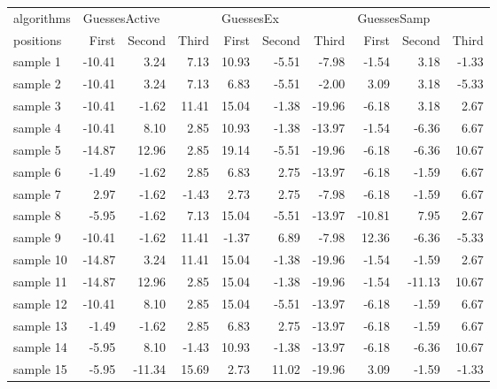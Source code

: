 \begin{table}
\begin{tabular}{lrrrrrrrrr}
\toprule
algorithms & \multicolumn{3}{l}{GuessesActive} & \multicolumn{3}{l}{GuessesEx} & \multicolumn{3}{l}{GuessesSamp} \\
positions &  First &   Second &    Third &    First &  Second &  Third &    First &  Second &  Third \\
\midrule
sample 1  &        -10.41 &   3.24 &   7.13 &     10.93 &  -5.51 &  -7.98 &       -1.54 &   3.18 &  -1.33 \\
sample 2  &        -10.41 &   3.24 &   7.13 &      6.83 &  -5.51 &  -2.00 &        3.09 &   3.18 &  -5.33 \\
sample 3  &        -10.41 &  -1.62 &  11.41 &     15.04 &  -1.38 & -19.96 &       -6.18 &   3.18 &   2.67 \\
sample 4  &        -10.41 &   8.10 &   2.85 &     10.93 &  -1.38 & -13.97 &       -1.54 &  -6.36 &   6.67 \\
sample 5  &        -14.87 &  12.96 &   2.85 &     19.14 &  -5.51 & -19.96 &       -6.18 &  -6.36 &  10.67 \\
sample 6  &         -1.49 &  -1.62 &   2.85 &      6.83 &   2.75 & -13.97 &       -6.18 &  -1.59 &   6.67 \\
sample 7  &          2.97 &  -1.62 &  -1.43 &      2.73 &   2.75 &  -7.98 &       -6.18 &  -1.59 &   6.67 \\
sample 8  &         -5.95 &  -1.62 &   7.13 &     15.04 &  -5.51 & -13.97 &      -10.81 &   7.95 &   2.67 \\
sample 9  &        -10.41 &  -1.62 &  11.41 &     -1.37 &   6.89 &  -7.98 &       12.36 &  -6.36 &  -5.33 \\
sample 10 &        -14.87 &   3.24 &  11.41 &     15.04 &  -1.38 & -19.96 &       -1.54 &  -1.59 &   2.67 \\
sample 11 &        -14.87 &  12.96 &   2.85 &     15.04 &  -1.38 & -19.96 &       -1.54 & -11.13 &  10.67 \\
sample 12 &        -10.41 &   8.10 &   2.85 &     15.04 &  -5.51 & -13.97 &       -6.18 &  -1.59 &   6.67 \\
sample 13 &         -1.49 &  -1.62 &   2.85 &      6.83 &   2.75 & -13.97 &       -6.18 &  -1.59 &   6.67 \\
sample 14 &         -5.95 &   8.10 &  -1.43 &     10.93 &  -1.38 & -13.97 &       -6.18 &  -6.36 &  10.67 \\
sample 15 &         -5.95 & -11.34 &  15.69 &      2.73 &  11.02 & -19.96 &        3.09 &  -1.59 &  -1.33 \\

\end{tabular}
\end{table}
